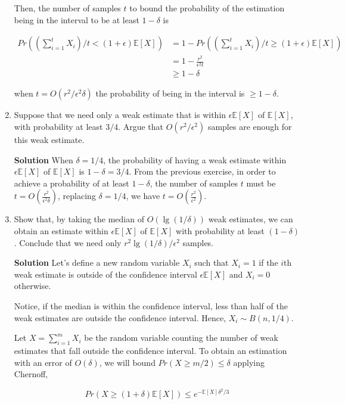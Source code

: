 \documentclass[12pt, a4paper]{article} %
\newcommand\expect[1]{\mathbb{E}[#1]}
\begin{document}
\begin{enumerate}[label=(\alph*)]
    Then, the number of samples $t$ to bound the probability of the estimation being in the interval to be at least $1-\delta$ is

    \begin{align*}
      Pr((\sum_{i=1}^{t}X_{i})/t < (1+\epsilon)\expect{X}) &= 1 - Pr((\sum_{i=1}^{t}X_{i})/t \ge (1+\epsilon)\expect{X}) \\
      &= 1 - \frac{r^{2}}{\epsilon^{2} t} \\
      &\ge 1 - \delta
    \end{align*}

    when $t = O(r^{2}/\epsilon^{2} \delta)$ the probability of being in the interval is $\ge 1 - \delta$.

  \item Suppose that we need only a weak estimate that is within $\epsilon\expect{X}$ of $\expect{X}$, with probability at least $3/4$. Argue that $O(r^{2}/\epsilon^{2})$ samples are enough for this weak estimate.

  \textbf{Solution} When $\delta = 1/4$, the probability of having a weak estimate within $\epsilon\expect{X}$ of $\expect{X}$ is $1 - \delta = 3/4$. From the previous exercise, in order to achieve a probability of at least $1 - \delta$, the number of samples $t$ must be $t = O(\frac{r^{2}}{\epsilon^{2} \delta})$, replacing $\delta = 1/4$, we have $t = O(\frac{r^{2}}{\epsilon^{2}})$.
  \item Show that, by taking the median of $O(\lg(1/\delta))$ weak estimates, we can obtain an estimate within $\epsilon\expect{X}$ of $\expect{X}$ with probability at least $(1 - \delta)$. Conclude that we need only $r^{2}\lg(1/\delta)/\epsilon^{2}$ samples.

    \textbf{Solution} Let's define a new random variable $X_{i}$ such that $X_{i} = 1$ if the $i$th weak estimate is outside of the confidence interval $\epsilon \expect{X}$ and $X_{i} = 0$ otherwise.

    Notice, if the median is within the confidence interval, less than half of the weak estimates are outside the confidence interval. Hence, $X_{i} \sim B(n, 1/4)$.

    Let $X = \sum_{i=1}^{m} X_{i}$ be the random variable counting the number of weak estimates that fall outside the confidence interval. To obtain an estimation with an error of $O(\delta)$, we will bound $Pr(X \ge m/2) \le \delta$ applying Chernoff,

    \begin{equation*}
      Pr(X \ge (1 + \delta)\expect{X}) \le e^{-\expect{X} \delta ^{2} / 3}
    \end{equation*}


\end{enumerate}
\end{document}
